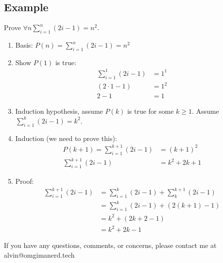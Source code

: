 \documentclass[letterpaper, 12pt]{math}
\begin{document}
\subsection*{Example}
Prove \( \forall{n}\sum_{i=1}^{n}(2i-1) = n^{2} \).
\begin{enumerate}
  \item Basis: \( P(n) = \sum_{i=1}^{n}(2i-1) = n^{2} \)
  \item Show \( P(1) \) is true:
    \begin{align*}
      \sum_{i=1}^{1}(2i-1) &= 1^{1} \\
      (2\cdot1-1) &= 1^{2} \\
      2-1 &= 1
    \end{align*}
  \item Induction hypothesis, assume \( P(k) \) is true for some \( k\geq 1 \).
    Assume \( \sum_{i=1}^{k}(2i-1) = k^{2} \).
  \item Induction (we need to prove this):
    \begin{align*}
      P(k+1) = \sum_{i=1}^{k+1}(2i-1) &= (k+1)^{2} \\
      \sum_{i=1}^{k+1}(2i-1) &= k^{2}+2k+1
    \end{align*}
  \item Proof:
    \begin{align*}
      \sum_{i=1}^{k+1}(2i-1) &= \sum_{i=1}^{k}(2i-1)+\sum_{k}^{k+1}(2i-1) \\
      &= \sum_{i=1}^{k}(2i-1)+(2(k+1)-1) \\
      &= k^{2}+(2k+2-1) \\
      &= k^{2}+2k-1
    \end{align*}
\end{enumerate}

\begin{center}
  If you have any questions, comments, or concerns, please contact me at
  alvin@omgimanerd.tech
\end{center}
\end{document}
